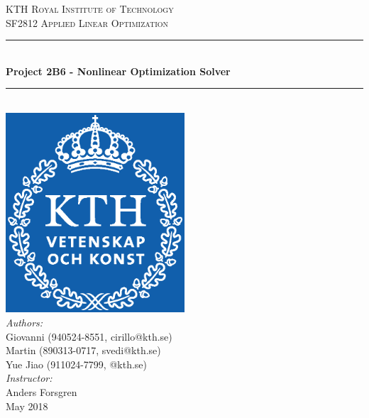 \begin{titlepage}
\newcommand{\HRule}{\rule{\linewidth}{0.5mm}} 
\center 
\textsc{\LARGE KTH Royal Institute of Technology}\\[0.7cm]

\textsc{\Large SF2812 Applied Linear Optimization}\\[1cm]

\HRule \\[0.7cm]
{ \huge \bfseries Project 2B6 - Nonlinear Optimization Solver }\\[0.7cm]                            
\HRule \\[1cm]
\includegraphics[width=0.5\textwidth]{KTH_Logo.eps}\\[1cm]
\Large
\emph{Authors:}\\
Giovanni (940524-8551, cirillo@kth.se) \\
Martin (890313-0717, svedi@kth.se) \\
Yue Jiao (911024-7799, @kth.se)\\
\emph{Instructor:}\\
Anders Forsgren\\[0.5cm]
{\large May 2018}
\vfill 
\end{titlepage}